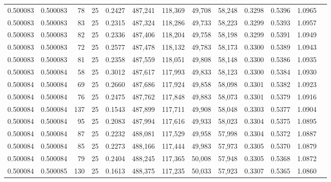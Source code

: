 \begin{tabular}{rrrrrrrrrrrrr}
0.500083 & 0.500083 &    78 &  25 &                                     0.2427 & 487,241 & 118,369 &  49,708 &  58,248 & 0.3298 & 0.5396 & 1.0965 \\
0.500083 & 0.500083 &    83 &  25 &                                     0.2315 & 487,324 & 118,286 &  49,733 &  58,223 & 0.3299 & 0.5393 & 1.0957 \\
0.500083 & 0.500083 &    82 &  25 &                                     0.2336 & 487,406 & 118,204 &  49,758 &  58,198 & 0.3299 & 0.5391 & 1.0949 \\
0.500083 & 0.500083 &    72 &  25 &                                     0.2577 & 487,478 & 118,132 &  49,783 &  58,173 & 0.3300 & 0.5389 & 1.0943 \\
0.500083 & 0.500083 &    81 &  25 &                                     0.2358 & 487,559 & 118,051 &  49,808 &  58,148 & 0.3300 & 0.5386 & 1.0935 \\
0.500083 & 0.500084 &    58 &  25 &                                     0.3012 & 487,617 & 117,993 &  49,833 &  58,123 & 0.3300 & 0.5384 & 1.0930 \\
0.500084 & 0.500084 &    69 &  25 &                                     0.2660 & 487,686 & 117,924 &  49,858 &  58,098 & 0.3301 & 0.5382 & 1.0923 \\
0.500084 & 0.500084 &    76 &  25 &                                     0.2475 & 487,762 & 117,848 &  49,883 &  58,073 & 0.3301 & 0.5379 & 1.0916 \\
0.500084 & 0.500084 &   137 &  25 &                                     0.1543 & 487,899 & 117,711 &  49,908 &  58,048 & 0.3303 & 0.5377 & 1.0904 \\
0.500084 & 0.500084 &    95 &  25 &                                     0.2083 & 487,994 & 117,616 &  49,933 &  58,023 & 0.3304 & 0.5375 & 1.0895 \\
0.500084 & 0.500084 &    87 &  25 &                                     0.2232 & 488,081 & 117,529 &  49,958 &  57,998 & 0.3304 & 0.5372 & 1.0887 \\
0.500084 & 0.500084 &    85 &  25 &                                     0.2273 & 488,166 & 117,444 &  49,983 &  57,973 & 0.3305 & 0.5370 & 1.0879 \\
0.500084 & 0.500084 &    79 &  25 &                                     0.2404 & 488,245 & 117,365 &  50,008 &  57,948 & 0.3305 & 0.5368 & 1.0872 \\
0.500084 & 0.500085 &   130 &  25 &                                     0.1613 & 488,375 & 117,235 &  50,033 &  57,923 & 0.3307 & 0.5365 & 1.0860 \\

\end{tabular}

